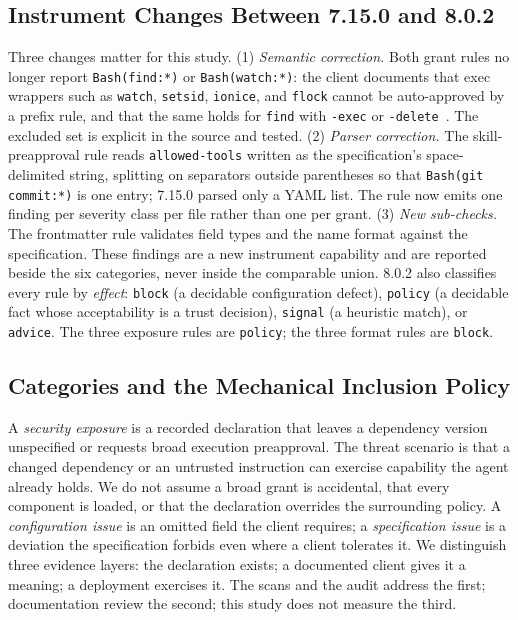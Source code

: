 \documentclass[10pt,conference]{IEEEtran}
\newcommand{\vold}{7.15.0}
\newcommand{\vnew}{8.0.2}
\begin{document}
\subsection{Instrument Changes Between \vold{} and \vnew{}}

Three changes matter for this study. (1) \emph{Semantic correction.} Both grant rules no longer report \texttt{Bash(find:*)} or \texttt{Bash(watch:*)}: the client documents that exec wrappers such as \texttt{watch}, \texttt{setsid}, \texttt{ionice}, and \texttt{flock} cannot be auto-approved by a prefix rule, and that the same holds for \texttt{find} with \texttt{-exec} or \texttt{-delete}~\cite{claude_permissions}. The excluded set is explicit in the source and tested. (2) \emph{Parser correction.} The skill-preapproval rule reads \texttt{allowed-tools} written as the specification's space-delimited string, splitting on separators outside parentheses so that \texttt{Bash(git commit:*)} is one entry; \vold{} parsed only a YAML list. The rule now emits one finding per severity class per file rather than one per grant. (3) \emph{New sub-checks.} The frontmatter rule validates field types and the name format against the specification. These findings are a new instrument capability and are reported beside the six categories, never inside the comparable union. \vnew{} also classifies every rule by \emph{effect}: \texttt{block} (a decidable configuration defect), \texttt{policy} (a decidable fact whose acceptability is a trust decision), \texttt{signal} (a heuristic match), or \texttt{advice}. The three exposure rules are \texttt{policy}; the three format rules are \texttt{block}.

\subsection{Categories and the Mechanical Inclusion Policy}
\label{sec:policy}

A \emph{security exposure} is a recorded declaration that leaves a dependency version unspecified or requests broad execution preapproval. The threat scenario is that a changed dependency or an untrusted instruction can exercise capability the agent already holds. We do not assume a broad grant is accidental, that every component is loaded, or that the declaration overrides the surrounding policy. A \emph{configuration issue} is an omitted field the client requires; a \emph{specification issue} is a deviation the specification forbids even where a client tolerates it. We distinguish three evidence layers: the declaration exists; a documented client gives it a meaning; a deployment exercises it. The scans and the audit address the first; documentation review the second; this study does not measure the third.
\end{document}
